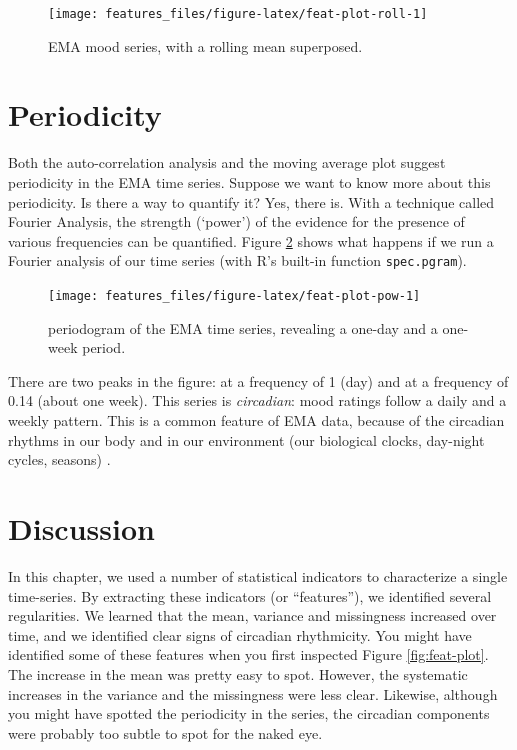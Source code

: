 \documentclass[]{book}
\begin{document}
\begin{figure}

{\centering \texttt{[image: features\_files/figure-latex/feat-plot-roll-1]} 

}

\caption{EMA mood series, with a rolling mean superposed.}\label{fig:feat-plot-roll}
\end{figure}

\section{Periodicity}\label{periodicity}


Both the auto-correlation analysis and the moving average plot suggest
periodicity in the EMA time series. Suppose we want to know more about
this periodicity. Is there a way to quantify it? Yes, there is. With a
technique called Fourier Analysis, the strength (`power') of the
evidence for the presence of various frequencies can be quantified.
Figure \ref{fig:feat-plot-pow} shows what happens if we run a Fourier
analysis of our time series (with R's built-in function
\texttt{spec.pgram}).

\begin{figure}

{\centering \texttt{[image: features\_files/figure-latex/feat-plot-pow-1]} 

}

\caption{periodogram of the EMA time series, revealing a one-day and a one-week period.}\label{fig:feat-plot-pow}
\end{figure}

There are two peaks in the figure: at a frequency of 1 (day) and at a
frequency of 0.14 (about one week). This series is \emph{circadian}:
mood ratings follow a daily and a weekly pattern. This is a common
feature of EMA data, because of the circadian rhythms in our body and in
our environment (our biological clocks, day-night cycles, seasons)
\citep{Doherty2018, Frank2000, Frank2007, Karatsoreos2014, VanSomeren2000, Tahmasian2013}.

\section{Discussion}\label{discussion-1}

In this chapter, we used a number of statistical indicators to
characterize a single time-series. By extracting these indicators (or
``features''), we identified several regularities. We learned that the
mean, variance and missingness increased over time, and we identified
clear signs of circadian rhythmicity. You might have identified some of
these features when you first inspected Figure \ref{fig:feat-plot}. The
increase in the mean was pretty easy to spot. However, the systematic
increases in the variance and the missingness were less clear. Likewise,
although you might have spotted the periodicity in the series, the
circadian components were probably too subtle to spot for the naked eye.
\end{document}
